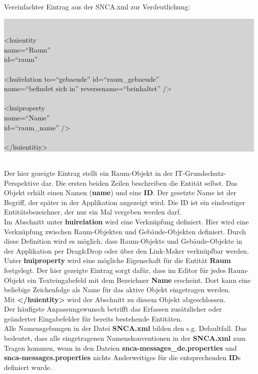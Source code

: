 \documentclass[a4paper,10pt]{book}
\begin{document}
Vereinfachter Eintrag aus der SNCA.xml zur Verdeutlichung:
\newline\\
\colorbox{lightgray}{\parbox{\textwidth}{{\tt
\begin{tabbing}
\textless huientity \= \\
\> name=``Raum'' \\
\> id=``raum'' \\
\\
\> \textless hui\=relation to=``gebaeude'' id=``raum\_gebaeude'' \\
\> \> name=``befindet sich in'' reversename=``beinhaltet'' /\textgreater \\
\\
\> \textless huiproperty \\
\> \> name=``Name'' \\
\> \> id=``raum\_name'' /\textgreater \\
\\
\textless/huientitiy\textgreater \\
\end{tabbing}}}
}
\newline\\
Der hier gezeigte Eintrag stellt ein Raum-Objekt in der IT-Grundschutz-Perspektive dar. Die ersten beiden Zeilen beschreiben die Entität selbst.
Das Objekt erhält einen Namen (\textbf{name}) und eine \textbf{ID}. Der gesetzte Name ist der Begriff, der später in der Applikation angezeigt wird.
Die ID ist ein eindeutiger Entitätsbezeichner, der nur ein Mal vergeben werden darf.
\newline\\
Im Abschnitt unter \textbf{huirelation} wird eine Verknüpfung definiert. Hier wird eine Verknüpfung zwischen Raum-Objekten und Gebäude-Objekten
definiert. Durch diese Definition wird es möglich, dass Raum-Objekte und Gebäude-Objekte in der Applikation per Drag\&Drop oder über den Link-Maker
verknüpfbar werden.
\newline\\
Unter \textbf{huiproperty} wird eine mögliche Eigenschaft für die Entität \textbf{Raum} festgelegt. Der hier gezeigte Eintrag sorgt dafür,
dass im Editor für jedes Raum-Objekt ein Texteingabefeld mit dem Bezeichner \textbf{Name} erscheint. Dort kann eine beliebige Zeichenfolge
als Name für das aktive Objekt eingetragen werden.
\newline\\
Mit \textbf{\textless/huientity\textgreater} wird der Abschnitt zu diesem Objekt abgeschlossen.
\newline\\
Der häufigste Anpassungswunsch betrifft das Erfassen zusätzlicher oder geänderter Eingabefelder für bereits bestehende Entitäten.
\newline\\
Alle Namensgebungen in der Datei \textbf{SNCA.xml} bilden den s.g. Defaultfall. Das bedeutet, dass alle eingetragenen Namenskonventionen in
der \textbf{SNCA.xml} zum Tragen kommen, wenn in den Dateien
\textbf{snca-messages\_de.properties} und \textbf{snca-messages.properties}
nichts Anderweitiges für die entsprechenden \textbf{ID}s definiert wurde.
\end{document}
